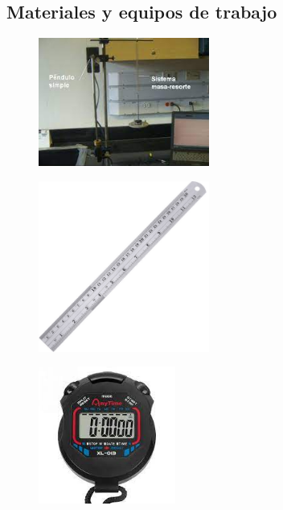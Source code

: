 \subsection{Materiales y  equipos de trabajo}
\begin{figure}[H]
	\begin{center}
 		\includegraphics[width = 0.5\textwidth]{Imagenes/pen.jpg}
	\end{center} 
\end{figure}

\begin{figure}[H]
	\begin{center}
 		\includegraphics[width = 0.5\textwidth]{Imagenes/regla.jpg}
	\end{center} 
\end{figure}

\begin{figure}[H]
	\begin{center}
 		\includegraphics[width = 0.4\textwidth]{Imagenes/crono.jpg}
	\end{center} 
\end{figure}

